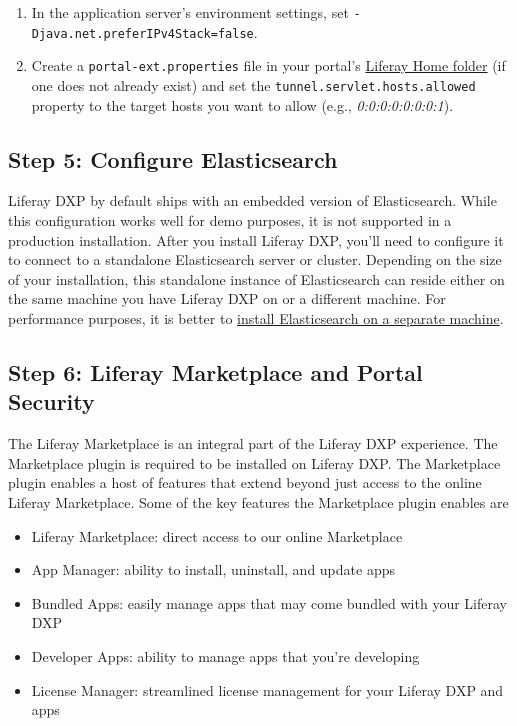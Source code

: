 \begin{enumerate}
\def\labelenumi{\arabic{enumi}.}
\item
  In the application server's environment settings, set
  \texttt{-Djava.net.preferIPv4Stack=false}.
\item
  Create a \texttt{portal-ext.properties} file in your portal's
  \href{/docs/7-1/deploy/-/knowledge_base/d/installing-liferay\#liferay-home}{Liferay
  Home folder} (if one does not already exist) and set the
  \texttt{tunnel.servlet.hosts.allowed} property to the target hosts you
  want to allow (e.g., \emph{0:0:0:0:0:0:0:1}).
\end{enumerate}

\subsection{Step 5: Configure
Elasticsearch}\label{step-5-configure-elasticsearch}

Liferay DXP by default ships with an embedded version of Elasticsearch.
While this configuration works well for demo purposes, it is not
supported in a production installation. After you install Liferay DXP,
you'll need to configure it to connect to a standalone Elasticsearch
server or cluster. Depending on the size of your installation, this
standalone instance of Elasticsearch can reside either on the same
machine you have Liferay DXP on or a different machine. For performance
purposes, it is better to
\href{/docs/7-1/deploy/-/knowledge_base/d/installing-elasticsearch}{install
Elasticsearch on a separate machine}.

\subsection{Step 6: Liferay Marketplace and Portal
Security}\label{step-6-liferay-marketplace-and-portal-security}

The Liferay Marketplace is an integral part of the Liferay DXP
experience. The Marketplace plugin is required to be installed on
Liferay DXP. The Marketplace plugin enables a host of features that
extend beyond just access to the online Liferay Marketplace. Some of the
key features the Marketplace plugin enables are

\begin{itemize}
\tightlist
\item
  Liferay Marketplace: direct access to our online Marketplace
\item
  App Manager: ability to install, uninstall, and update apps
\item
  Bundled Apps: easily manage apps that may come bundled with your
  Liferay DXP
\item
  Developer Apps: ability to manage apps that you're developing
\item
  License Manager: streamlined license management for your Liferay DXP
  and apps
\end{itemize}

